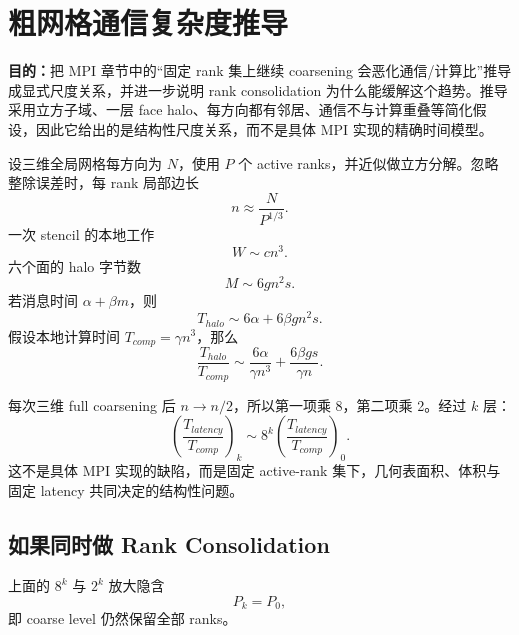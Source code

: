 \chapter{粗网格通信复杂度推导}
\label{app:communication}

\begin{keybox}
\textbf{目的：}把 MPI 章节中的“固定 rank 集上继续 coarsening 会恶化通信/计算比”推导成显式尺度关系，并进一步说明 rank consolidation 为什么能缓解这个趋势。推导采用立方子域、一层 face halo、每方向都有邻居、通信不与计算重叠等简化假设，因此它给出的是结构性尺度关系，而不是具体 MPI 实现的精确时间模型。
\end{keybox}


设三维全局网格每方向为 $N$，使用 $P$ 个 active ranks，并近似做立方分解。忽略整除误差时，每 rank 局部边长
\begin{equation}
n\approx \frac{N}{P^{1/3}}.
\label{eq:appc-local-size}
\end{equation}
一次 stencil 的本地工作
\begin{equation}
W\sim c n^3.
\end{equation}
六个面的 halo 字节数
\begin{equation}
M\sim 6g n^2s.
\end{equation}
若消息时间 $\alpha+\beta m$，则
\begin{equation}
T_{halo}\sim6\alpha+6\beta g n^2s.
\end{equation}
假设本地计算时间 $T_{comp}=\gamma n^3$，那么
\begin{equation}
\frac{T_{halo}}{T_{comp}}
\sim\frac{6\alpha}{\gamma n^3}
+\frac{6\beta gs}{\gamma n}.
\end{equation}

每次三维 full coarsening 后 $n\to n/2$，所以第一项乘 8，第二项乘 2。经过 $k$ 层：
\begin{equation}
\left(\frac{T_{latency}}{T_{comp}}\right)_k
\sim8^k
\left(\frac{T_{latency}}{T_{comp}}\right)_0.
\end{equation}
这不是具体 MPI 实现的缺陷，而是固定 active-rank 集下，几何表面积、体积与固定 latency 共同决定的结构性问题。

\section*{如果同时做 Rank Consolidation}

上面的 $8^k$ 与 $2^k$ 放大隐含
\begin{equation}
P_k=P_0,
\end{equation}
即 coarse level 仍然保留全部 ranks。

